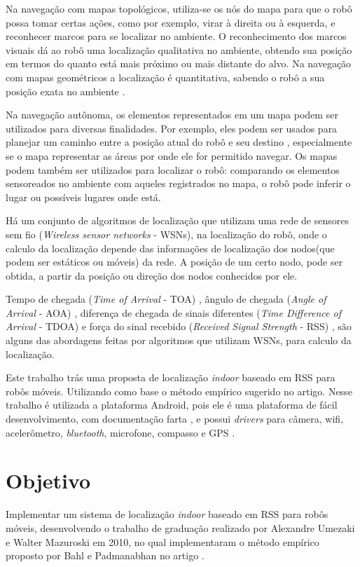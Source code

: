 	Na navegação com mapas topológicos, utiliza-se os nós do mapa para que o robô possa tomar certas ações, como por
exemplo, virar à direita ou à esquerda, e reconhecer marcos para se localizar no ambiente. 
O reconhecimento dos marcos visuais dá ao robô uma localização qualitativa no ambiente,
obtendo sua posição em termos do quanto está mais próximo ou mais distante do alvo. Na
navegação com mapas geométricos a localização é quantitativa, sabendo o robô a sua posição
exata no ambiente \cite{construcaoMapas}.

	Na navegação autônoma, os elementos representados em um mapa podem ser utilizados para diversas finalidades. Por exemplo,
eles podem ser usados para planejar um caminho entre a posição atual do robô e seu
destino \cite{cnn}, especialmente se o mapa representar as áreas por onde ele for permitido navegar. Os mapas podem também ser
utilizados para localizar o robô: comparando os elementos sensoreados no ambiente com aqueles registrados no mapa, o robô pode
inferir o lugar ou possíveis lugares onde está.
	
	Há um conjunto de algoritmos de localização que utilizam uma rede de sensores sem fio (\textit{Wireless sensor networks} - WSNs), 
	na localização do robô, 
	onde o calculo da localização depende das informações de localização dos nodos(que podem ser estáticos ou móveis) da rede\cite{omc}.
	A posição de um certo nodo, pode ser obtida, a partir da posição ou direção dos nodos conhecidos por ele.%
	
	Tempo de chegada (\textit{Time of Arrival} - TOA) \cite{gps}, ângulo de chegada (\textit{Angle of Arrival} - AOA) \cite{aoa}, 
	diferença de chegada de sinais diferentes (\textit{Time Difference of Arrival} - TDOA) \cite{tdoa} 
	e força do sinal recebido (\textit{Received Signal Strength} - RSS) \cite{wifiRadar}, são alguns das abordagens feitas por algoritmos que utilizam WSNs,
	para calculo da localização.
	
	Este trabalho trás uma proposta de localização \textit{indoor} baseado em RSS para robôs móveis.
	Utilizando como base o método empírico sugerido no artigo\cite{wifiRadar}. Nesse trabalho
	é utilizada a plataforma Android, pois ele \cite{androidSite} é uma plataforma de fácil desenvolvimento, 
	com documentação farta \cite{androidDev}, e possui \textit{drivers} para câmera, wifi, acelerômetro, 
	\textit{bluetooth}, microfone, compasso e GPS \cite{androidRobot}. 
  
\clearpage
\section{Objetivo}
	Implementar um sistema de localização \textit{indoor} baseado em RSS para robôs móveis,
	desenvolvendo o trabalho de graduação realizado por 
  Alexandre Umezaki e Walter Mazuroski em 2010, no qual implementaram o método empírico proposto
  por Bahl e Padmanabhan no artigo \cite{wifiRadar}.
  
